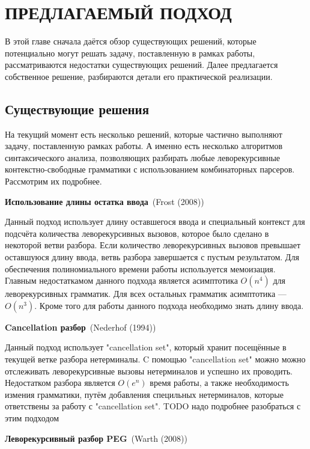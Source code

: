 \documentclass[times]{itmo-student-thesis}
\begin{document}
\chapter{ПРЕДЛАГАЕМЫЙ ПОДХОД}

В этой главе сначала даётся обзор существующих решений, которые потенциально могут решать задачу, поставленную в рамках 
работы, рассматриваются недостатки существующих решений. Далее предлагается собственное решение, разбираются детали его
практической реализации.

\section{Существующие решения}\label{sec:existing_solutions}

На текущий момент есть несколько решений, которые частично выполняют задачу, поставленную рамках работы. А именно есть
несколько алгоритмов синтаксического анализа, позволяющих разбирать любые леворекурсивные контекстно-свободные грамматики с
использованием комбинаторных парсеров. Рассмотрим их подробнее.

\textbf{Использование длины остатка ввода}~(Frost (2008)\cite{hudak_parser_2008})

Данный подход использует длину оставшегося ввода и специальный контекст для подсчёта количества леворекурсивных вызовов, которое
было сделано в некоторой ветви разбора. Если количество леворекурсивных вызовов превышает оставшуюся длину ввода, ветвь разбора
завершается с пустым результатом. Для обеспечения полиномиального времени работы используется мемоизация. Главным недостаткамом данного 
подхода является асимптотика $O(n^4)$ для леворекурсивных грамматик. Для всех остальных грамматик асимптотика --- $O(n^3)$. Кроме
того для работы данного подхода необходимо знать длину ввода.

\textbf{Cancellation разбор}~(Nederhof (1994)\cite{nederhof_linguistic_1994})
    
Данный подход использует "cancellation set", который хранит посещённые в текущей ветке разбора нетерминалы. C помощью "cancellation set"
можно можно отслеживать леворекурсивные вызовы нетерминалов и успешно их проводить. Недостатком разбора является $O(e^n)$ время работы,
а также необходимость измения грамматики, путём добавления специльных нетерминалов, которые ответствены за работу с "cancellation set".
TODO надо подробнее разобраться с этим подходом

\textbf{Леворекурсивный разбор PEG}~(Warth (2008)\cite{warth_packrat_2008})
\end{document}
